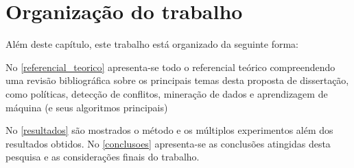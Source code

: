 \documentclass[
	12pt,				%
	openright,			%
	oneside,			%
	a4paper,			%
	english,			%
	french,				%
	spanish,			%
	brazil				%
	]{abntex2}
\begin{document}
\section{Organização do trabalho}
Além deste capítulo, este trabalho está organizado da seguinte forma:

No \autoref{referencial_teorico} apresenta-se todo o referencial teórico compreendendo uma revisão bibliográfica sobre os principais temas desta proposta de dissertação, como políticas, detecção de conflitos, mineração de dados e aprendizagem de máquina (e seus algoritmos principais)

No \autoref{resultados} são mostrados o método e os múltiplos experimentos além dos resultados obtidos.
No \autoref{conclusoes} apresenta-se as conclusões atingidas desta pesquisa e as considerações finais do trabalho.

\clearpage

%
%

%
%
%
\end{document}
